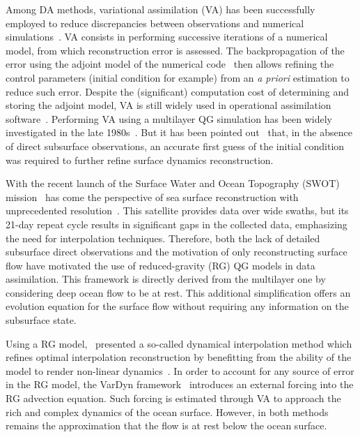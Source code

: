 \documentclass[
  draft
]{agujournal2025}
\begin{document}
Among DA methods, variational assimilation (VA) has been successfully employed to reduce discrepancies between observations and numerical simulations~\cite{gunson1996,cong1998,zou1995,vogeler1995,vogeler1999}. VA consists in performing successive iterations of a numerical model, from which reconstruction error is assessed. The backpropagation of the error using the adjoint model of the numerical code~\cite{errico1997} then allows refining the control parameters (initial condition for example) from an \textit{a priori} estimation to reduce such error. Despite the (significant) computation cost of determining and storing the adjoint model, VA is still widely used in operational assimilation software~\cite{martin2025}. Performing VA using a multilayer QG simulation has been widely investigated in the late 1980s~\cite{cong1998,vogeler1995,vogeler1999}. But it has been pointed out~\cite{vogeler1995,vogeler1999,hurlburt1986,morrow1995} that, in the absence of direct subsurface observations, an accurate first guess of the initial condition was required to further refine surface dynamics reconstruction.

With the recent launch of the Surface Water and Ocean Topography (SWOT) mission~\cite{fu2024} has come the perspective of sea surface reconstruction with unprecedented resolution~\cite{benkiran2026}. This satellite provides data over wide swaths, but its 21-day repeat cycle results in significant gaps in the collected data, emphasizing the need for interpolation techniques. Therefore, both the lack of detailed subsurface direct observations and the motivation of only reconstructing surface flow have motivated the use of reduced-gravity (RG) QG models in data assimilation. This framework is directly derived from the multilayer one by considering deep ocean flow to be at rest. This additional simplification offers an evolution equation for the surface flow without requiring any information on the subsurface state. 

Using a RG model,~ presented a so-called dynamical interpolation method which refines optimal interpolation reconstruction by benefitting from the ability of the model to render non-linear dynamics~\cite{ubelmann2016}. In order to account for any source of error in the RG model, the VarDyn framework~\cite{leguillou2023,leguillou2025} introduces an external forcing into the RG advection equation. Such forcing is estimated through VA to approach the rich and complex dynamics of the ocean surface. However, in both methods remains the approximation that the flow is at rest below the ocean surface.
\end{document}
